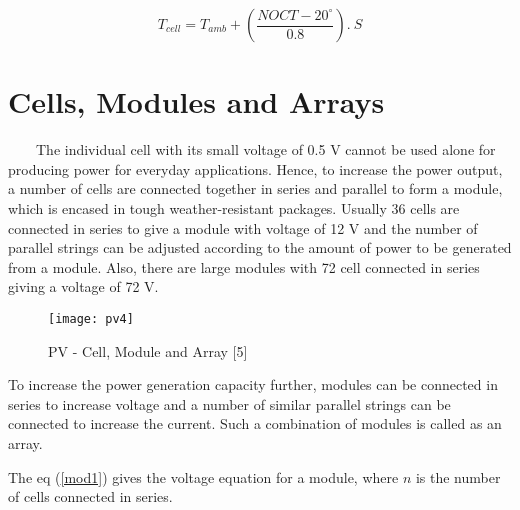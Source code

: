 \begin{equation}
\label{tefpv}
T_{{cell}}=T_{{amb}}+\left(\frac{NOCT-20^{\circ}}{0.8}\right)
.\ S
\end{equation}

\newpage

\section{Cells, Modules and Arrays}
\
\
\
\
The individual cell with its small voltage of 0.5 V cannot be used alone for producing power for everyday applications. Hence, to increase the power output, a number of cells are connected together in series and parallel to form a module, which is encased in tough weather-resistant packages. Usually 36 cells are connected in series to give a module with voltage of 12 V and the number of parallel strings can be adjusted according to the amount of power to be generated from a module. Also, there are large modules with 72 cell connected in series giving a voltage of 72 V.

\begin{figure}[H]
\centering
\texttt{[image: pv4]}
\caption{PV - Cell, Module and Array [5]}
\label{figc3h444} %
\end{figure}

To increase the power generation capacity further, modules can be connected in series to increase voltage and a number of similar parallel strings can be connected to increase the current. Such a combination of modules is called as an array.

The eq (\ref{mod1}) gives the voltage equation for a module, where $n$ is the number of cells connected in series.

